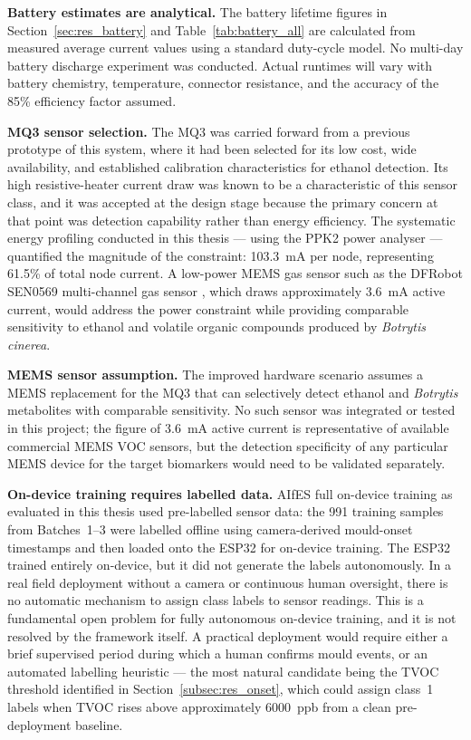 \textbf{Battery estimates are analytical.} The battery lifetime figures in Section~\ref{sec:res_battery} and Table~\ref{tab:battery_all} are calculated from measured average current values using a standard duty-cycle model. No multi-day battery discharge experiment was conducted. Actual runtimes will vary with battery chemistry, temperature, connector resistance, and the accuracy of the 85\% efficiency factor assumed.

\textbf{MQ3 sensor selection.} The MQ3 was carried forward from a previous prototype of this system, where it had been selected for its low cost, wide availability, and established calibration characteristics for ethanol detection. Its high resistive-heater current draw was known to be a characteristic of this sensor class, and it was accepted at the design stage because the primary concern at that point was detection capability rather than energy efficiency. The systematic energy profiling conducted in this thesis --- using the PPK2 power analyser --- quantified the magnitude of the constraint: \SI{103.3}{\milli\ampere} per node, representing 61.5\% of total node current. A low-power MEMS gas sensor such as the DFRobot SEN0569 multi-channel gas sensor \cite{DFRobotSEN0569}, which draws approximately \SI{3.6}{\milli\ampere} active current, would address the power constraint while providing comparable sensitivity to ethanol and volatile organic compounds produced by \textit{Botrytis cinerea}.

\textbf{MEMS sensor assumption.} The improved hardware scenario assumes a MEMS replacement for the MQ3 that can selectively detect ethanol and \textit{Botrytis} metabolites with comparable sensitivity. No such sensor was integrated or tested in this project; the figure of \SI{3.6}{\milli\ampere} active current is representative of available commercial MEMS VOC sensors, but the detection specificity of any particular MEMS device for the target biomarkers would need to be validated separately.

\textbf{On-device training requires labelled data.} AIfES full on-device training as evaluated in this thesis used pre-labelled sensor data: the 991 training samples from Batches~1--3 were labelled offline using camera-derived mould-onset timestamps and then loaded onto the ESP32 for on-device training. The ESP32 trained entirely on-device, but it did not generate the labels autonomously. In a real field deployment without a camera or continuous human oversight, there is no automatic mechanism to assign class labels to sensor readings. This is a fundamental open problem for fully autonomous on-device training, and it is not resolved by the framework itself. A practical deployment would require either a brief supervised period during which a human confirms mould events, or an automated labelling heuristic --- the most natural candidate being the TVOC threshold identified in Section~\ref{subsec:res_onset}, which could assign class~1 labels when TVOC rises above approximately \SI{6000}{ppb} from a clean pre-deployment baseline.

